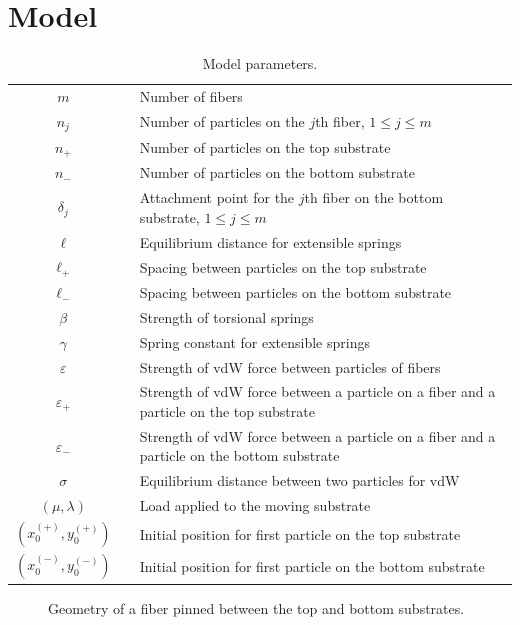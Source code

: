 \chapter{Model} \label{chap:two}

\begin{table}
	\centering
	\caption{Model parameters. \label{table:parameters}}
	\begin{tabular}{c p{.25in} p{4.5in}}
		$m$ & & Number of fibers \\
		$n_j$ & & Number of particles on the $j$th fiber, $1 \leq j \leq m$ \\
		$n_+$ & & Number of particles on the top substrate \\
		$n_-$ & & Number of particles on the bottom substrate \\
		$\delta_j$ & & Attachment point for the $j$th fiber on the bottom substrate, $1 \leq j \leq m$ \\
		$\ell$ & & Equilibrium distance for extensible springs \\
		$\ell_+$ & & Spacing between particles on the top substrate \\
		$\ell_-$ & & Spacing between particles on the bottom substrate \\
		$\beta$ & & Strength of torsional springs \\
		$\gamma$ & & Spring constant for extensible springs \\
		$\varepsilon$ & & Strength of vdW force between particles of fibers \\
		$\varepsilon_+$ & & Strength of vdW force between a particle on a fiber and a particle on the top substrate \\
		$\varepsilon_-$ & & Strength of vdW force between a particle on a fiber and a particle on the bottom substrate \\
		$\sigma$ & & Equilibrium distance between two particles for vdW \\
		$(\mu,\lambda)$ & & Load applied to the moving substrate \\
		$(x^{(+)}_0,y^{(+)}_0)$ & & Initial position for first particle on the top substrate \\
		$(x^{(-)}_0,y^{(-)}_0)$ & & Initial position for first particle on the bottom substrate
	\end{tabular}
\end{table}
	
	\begin{figure}
		\begin{center}
			
		\end{center}		
		\caption{Geometry of a fiber pinned between the top and bottom substrates.
		\label{fig:Geometry}}
	\end{figure}		
	
